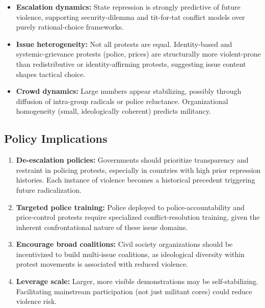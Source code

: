 \documentclass[11pt,a4paper]{article}
\begin{document}
\begin{itemize}
    \item \textbf{Escalation dynamics:} State repression is strongly predictive of future violence, supporting security-dilemma and tit-for-tat conflict models over purely rational-choice frameworks.
    
    \item \textbf{Issue heterogeneity:} Not all protests are equal. Identity-based and systemic-grievance protests (police, prices) are structurally more violent-prone than redistributive or identity-affirming protests, suggesting issue content shapes tactical choice.
    
    \item \textbf{Crowd dynamics:} Large numbers appear stabilizing, possibly through diffusion of intra-group radicals or police reluctance. Organizational homogeneity (small, ideologically coherent) predicts militancy.
\end{itemize}

\subsection{Policy Implications}

\begin{enumerate}
    \item \textbf{De-escalation policies:} Governments should prioritize transparency and restraint in policing protests, especially in countries with high prior repression histories. Each instance of violence becomes a historical precedent triggering future radicalization.
    
    \item \textbf{Targeted police training:} Police deployed to police-accountability and price-control protests require specialized conflict-resolution training, given the inherent confrontational nature of these issue domains.
    
    \item \textbf{Encourage broad coalitions:} Civil society organizations should be incentivized to build multi-issue coalitions, as ideological diversity within protest movements is associated with reduced violence.
    
    \item \textbf{Leverage scale:} Larger, more visible demonstrations may be self-stabilizing. Facilitating mainstream participation (not just militant cores) could reduce violence risk.
\end{enumerate}
\end{document}
